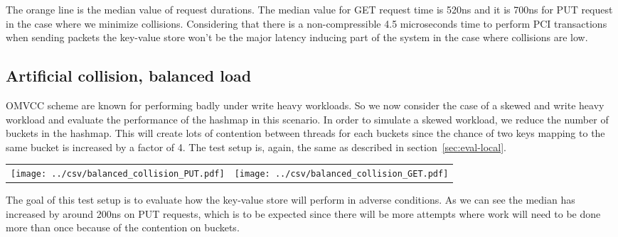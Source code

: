 The orange line is the median value of request durations. The median
value for GET request time is 520ns and it is 700ns for PUT request in
the case where we minimize collisions. Considering that there is a
non-compressible 4.5 microseconds time to perform PCI transactions
when sending packets the key-value store won't be the major latency
inducing part of the system in the case where collisions are low.

\subsection{Artificial collision, balanced load}

OMVCC scheme are known for performing badly under write heavy
workloads. So we now consider the case of a skewed and write heavy
workload and evaluate the performance of the hashmap in this
scenario. In order to simulate a skewed workload, we reduce the number
of buckets in the hashmap. This will create lots of contention between
threads for each buckets since the chance of two keys mapping to the
same bucket is increased by a factor of 4. The test setup is, again,
the same as described in section~\ref{sec:eval-local}.

\begin{center}
  \begin{tabular}{c c} \label{table:col-balanced}
    \texttt{[image: ../csv/balanced\_collision\_PUT.pdf]}
    &
      \texttt{[image: ../csv/balanced\_collision\_GET.pdf]}
  \end{tabular}
\end{center}

The goal of this test setup is to evaluate how the key-value store
will perform in adverse conditions. As we can see the median has
increased by around 200ns on PUT requests, which is to be expected
since there will be more attempts where work will need to be done more
than once because of the contention on buckets.

